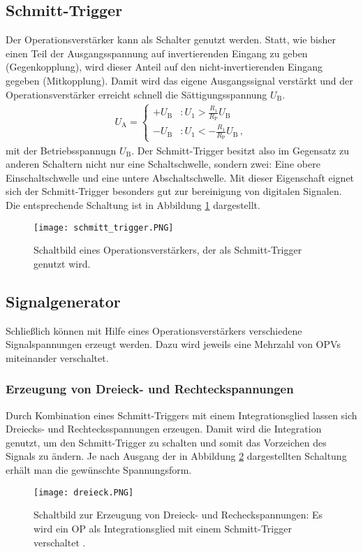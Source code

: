 \documentclass[
  bibliography=totoc,     %
  captions=tableheading,  %
  titlepage=firstiscover, %
]{scrartcl}
\begin{document}
\subsection{Schmitt-Trigger}
\label{subsec:schmitt_trigger}
Der Operationsverstärker kann als Schalter genutzt werden. Statt, wie bisher
einen Teil der Ausgangsspannung auf invertierenden Eingang zu geben (Gegenkopplung),
wird dieser Anteil auf den nicht-invertierenden Eingang gegeben (Mitkopplung).
Damit wird das eigene Ausgangssignal verstärkt und der Operationsverstärker erreicht
schnell die Sättigungsspannung $U_\text{B}$.
\begin{align}
    U_\text{A} =
    \begin{cases}
        +U_\text{B} &: U_1 > \frac{R_1}{R_\text{P}}U_\text{B} \\
        -U_\text{B} &: U_1 < -\frac{R_1}{R_\text{P}}U_\text{B}\,,
    \end{cases}
    \label{eqn:schmitt}
\end{align}
mit der Betriebsspannugn $U_\text{B}$. Der Schmitt-Trigger besitzt also im Gegensatz
zu anderen Schaltern nicht nur eine Schaltschwelle, sondern zwei: Eine obere Einschaltschwelle
und eine untere Abschaltschwelle. Mit dieser Eigenschaft eignet sich der Schmitt-Trigger
besonders gut zur bereinigung von digitalen Signalen.
Die entsprechende Schaltung ist in Abbildung \ref{fig:schmitt_trigger}
dargestellt.
\begin{figure}[H]
    \centering
    \texttt{[image: schmitt\_trigger.PNG]}
    \caption{
        Schaltbild eines Operationsverstärkers, der als Schmitt-Trigger
        genutzt wird.
    }
    \label{fig:schmitt_trigger}
\end{figure}
\clearpage
\subsection{Signalgenerator}
\label{subsec:signalgenerator}
Schließlich können mit Hilfe eines Operationsverstärkers verschiedene
Signalspannungen erzeugt werden. Dazu wird jeweils eine Mehrzahl von OPVs
miteinander verschaltet.

\subsubsection{Erzeugung von Dreieck- und Rechteckspannungen}
\label{subsubsec:dreieck}
Durch Kombination eines Schmitt-Triggers mit einem Integrationsglied
lassen sich Dreiecks- und Rechtecksspannungen erzeugen. Damit wird die
Integration genutzt, um den Schmitt-Trigger zu schalten und somit das
Vorzeichen des Signals zu ändern. Je nach Ausgang der in Abbildung
\ref{fig:dreieck} dargestellten Schaltung erhält man die gewünschte
Spannungsform.
\begin{figure}[H]
    \centering
    \texttt{[image: dreieck.PNG]}
    \caption{
        Schaltbild zur Erzeugung von Dreieck- und Recheckspannungen:
        Es wird ein OP als Integrationsglied mit einem Schmitt-Trigger
        verschaltet \cite{V51}.
    }
    \label{fig:dreieck}
\end{figure}
\end{document}
